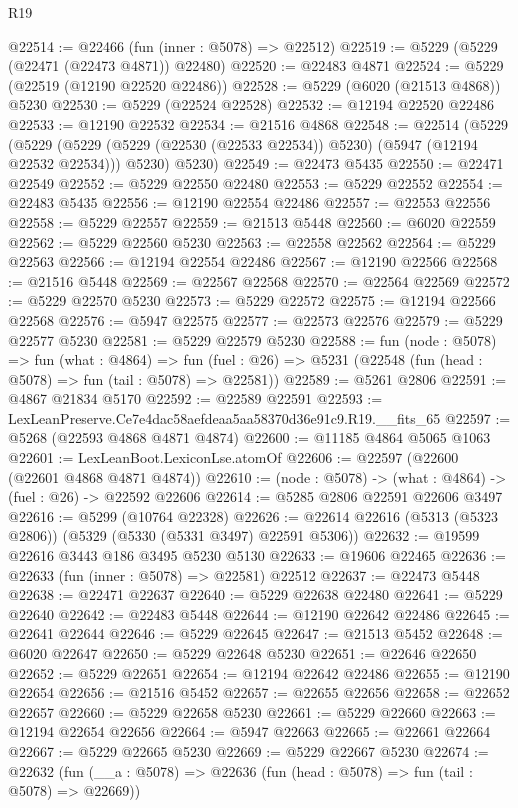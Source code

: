 \begin{lexlean}{R19}
\begin{coremodule}
@22514 := @22466 (fun (inner : @5078) => @22512)
@22519 := @5229 (@5229 (@22471 (@22473 @4871)) @22480)
@22520 := @22483 @4871
@22524 := @5229 (@22519 (@12190 @22520 @22486))
@22528 := @5229 (@6020 (@21513 @4868)) @5230
@22530 := @5229 (@22524 @22528)
@22532 := @12194 @22520 @22486
@22533 := @12190 @22532
@22534 := @21516 @4868
@22548 := @22514
    (@5229
      (@5229 (@5229 (@5229 (@22530 (@22533 @22534)) @5230) (@5947 (@12194 @22532 @22534))) @5230)
      @5230)
@22549 := @22473 @5435
@22550 := @22471 @22549
@22552 := @5229 @22550 @22480
@22553 := @5229 @22552
@22554 := @22483 @5435
@22556 := @12190 @22554 @22486
@22557 := @22553 @22556
@22558 := @5229 @22557
@22559 := @21513 @5448
@22560 := @6020 @22559
@22562 := @5229 @22560 @5230
@22563 := @22558 @22562
@22564 := @5229 @22563
@22566 := @12194 @22554 @22486
@22567 := @12190 @22566
@22568 := @21516 @5448
@22569 := @22567 @22568
@22570 := @22564 @22569
@22572 := @5229 @22570 @5230
@22573 := @5229 @22572
@22575 := @12194 @22566 @22568
@22576 := @5947 @22575
@22577 := @22573 @22576
@22579 := @5229 @22577 @5230
@22581 := @5229 @22579 @5230
@22588 := fun (node : @5078) =>
  fun (what : @4864) =>
  fun (fuel : @26) => @5231 (@22548 (fun (head : @5078) => fun (tail : @5078) => @22581))
@22589 := @5261 @2806
@22591 := @4867 @21834 @5170
@22592 := @22589 @22591
@22593 := LexLeanPreserve.Ce7e4dac58aefdeaa5aa58370d36e91c9.R19.__fits_65
@22597 := @5268 (@22593 @4868 @4871 @4874)
@22600 := @11185 @4864 @5065 @1063
@22601 := LexLeanBoot.LexiconLse.atomOf
@22606 := @22597 (@22600 (@22601 @4868 @4871 @4874))
@22610 := (node : @5078) -> (what : @4864) -> (fuel : @26) -> @22592 @22606
@22614 := @5285 @2806 @22591 @22606 @3497
@22616 := @5299 (@10764 @22328)
@22626 := @22614 @22616 (@5313 (@5323 @2806)) (@5329 (@5330 (@5331 @3497) @22591 @5306))
@22632 := @19599 @22616 @3443 @186 @3495 @5230 @5130
@22633 := @19606 @22465
@22636 := @22633 (fun (inner : @5078) => @22581) @22512
@22637 := @22473 @5448
@22638 := @22471 @22637
@22640 := @5229 @22638 @22480
@22641 := @5229 @22640
@22642 := @22483 @5448
@22644 := @12190 @22642 @22486
@22645 := @22641 @22644
@22646 := @5229 @22645
@22647 := @21513 @5452
@22648 := @6020 @22647
@22650 := @5229 @22648 @5230
@22651 := @22646 @22650
@22652 := @5229 @22651
@22654 := @12194 @22642 @22486
@22655 := @12190 @22654
@22656 := @21516 @5452
@22657 := @22655 @22656
@22658 := @22652 @22657
@22660 := @5229 @22658 @5230
@22661 := @5229 @22660
@22663 := @12194 @22654 @22656
@22664 := @5947 @22663
@22665 := @22661 @22664
@22667 := @5229 @22665 @5230
@22669 := @5229 @22667 @5230
@22674 := @22632 (fun (__a : @5078) => @22636 (fun (head : @5078) => fun (tail : @5078) => @22669))

\end{coremodule}
\end{lexlean}

